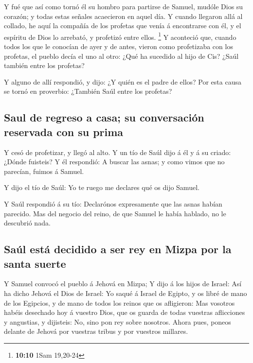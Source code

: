  Y fué que así como tornó él su hombro para partirse de
Samuel, mudóle Dios su corazón; y todas estas señales acaecieron en
aquel día.  Y cuando llegaron allá al collado, he aquí la
compañía de los profetas que venía á encontrarse con él, y el espíritu
de Dios lo arrebató, y profetizó entre ellos. \footnote{\textbf{10:10}
  1Sam 19,20-24}  Y aconteció que, cuando todos los que le
conocían de ayer y de antes, vieron como profetizaba con los profetas,
el pueblo decía el uno al otro: ¿Qué ha sucedido al hijo de Cis? ¿Saúl
también entre los profetas?

 Y alguno de allí respondió, y dijo: ¿Y quién es el padre
de ellos? Por esta causa se tornó en proverbio: ¿También Saúl entre los
profetas?

\hypertarget{saul-de-regreso-a-casa-su-conversaciuxf3n-reservada-con-su-prima}{%
\subsection{Saul de regreso a casa; su conversación reservada con su
prima}\label{saul-de-regreso-a-casa-su-conversaciuxf3n-reservada-con-su-prima}}

 Y cesó de profetizar, y llegó al alto.  Y un
tío de Saúl dijo á él y á su criado: ¿Dónde fuisteis? Y él respondió: A
buscar las asnas; y como vimos que no parecían, fuimos á Samuel.

 Y dijo el tío de Saúl: Yo te ruego me declares qué os dijo
Samuel.

 Y Saúl respondió á su tío: Declarónos expresamente que las
asnas habían parecido. Mas del negocio del reino, de que Samuel le había
hablado, no le descubrió nada.

\hypertarget{sauxfal-estuxe1-decidido-a-ser-rey-en-mizpa-por-la-santa-suerte}{%
\subsection{Saúl está decidido a ser rey en Mizpa por la santa
suerte}\label{sauxfal-estuxe1-decidido-a-ser-rey-en-mizpa-por-la-santa-suerte}}

 Y Samuel convocó el pueblo á Jehová en Mizpa;
 Y dijo á los hijos de Israel: Así ha dicho Jehová el Dios
de Israel: Yo saqué á Israel de Egipto, y os libré de mano de los
Egipcios, y de mano de todos los reinos que os afligieron: 
Mas vosotros habéis desechado hoy á vuestro Dios, que os guarda de todas
vuestras aflicciones y angustias, y dijisteis: No, sino pon rey sobre
nosotros. Ahora pues, poneos delante de Jehová por vuestras tribus y por
vuestros millares.

